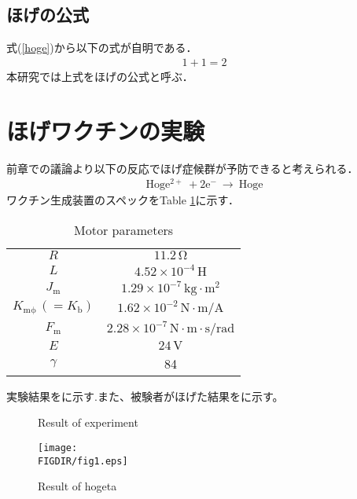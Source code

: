 \begin{small}
\subsection{ほげの公式}
式(\ref{hoge})から以下の式が自明である．
\begin{eqnarray}
1 + 1 = 2
\end{eqnarray}
本研究では上式をほげの公式と呼ぶ．
\section{ほげワクチンの実験}
前章での議論より以下の反応でほげ症候群が予防できると考えられる．
\begin{eqnarray}
\mathrm{Hoge^{2+} \ + 2e^{-} \ \rightarrow \ Hoge}
\end{eqnarray}
ワクチン生成装置のスペックをTable \ref{spec}に示す．
\begin{table}[b]
\caption{Motor parameters}
\label{spec}
\begin{center}
\begin{tabular}{c c}
\toprule
$R$ & $11.2\,\mathrm{\Omega}$ \\
$L$ & $4.52 \times 10^{-4}\,\mathrm{H}$ \\
$J_\mathrm{m}$ & $1.29 \times 10^{-7}\,\mathrm{kg \cdot m^2}$ \\
$K_\mathrm{m\phi}\,(=K_\mathrm{b})$ & $1.62 \times 10^{-2}\,\mathrm{N \cdot m / A}$ \\
$F_\mathrm{m}$ & $2.28 \times 10^{-7}\,\mathrm{N \cdot m \cdot s / rad}$ \\
$E$ & $24\,\mathrm{V}$ \\
$\gamma$ & 84 \\
\bottomrule
\end{tabular}
\end{center}
\end{table}
実験結果をに示す.また、被験者がほげた結果をに示す。

\begin{figure}[b]
\begin{center}
\caption{Result of experiment}
\end{center}
\end{figure}

\begin{figure}[b]
\begin{center}
\texttt{[image: \\FIGDIR/fig1.eps]}%
\caption{Result of hogeta}
\end{center}
\end{figure}

\end{small}
